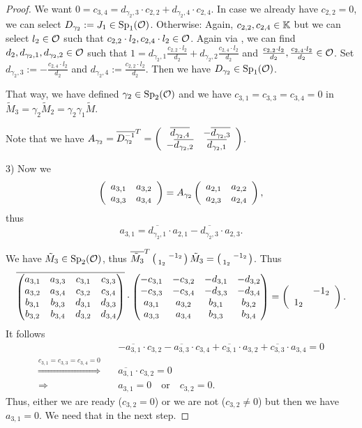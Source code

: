 \begin{lemma}[$solveR$]
\begin{proof}
We want $0 = c_{3,4} = d_{\gamma_2,3} \cdot c_{2,2} + d_{\gamma_2,4} \cdot c_{2,4}$. In case we already have $c_{2,2} = 0$, we can select $D_{\gamma_2} := J_1 \in \operatorname{Sp}_1(\mathcal{O})$. Otherwise: Again, $c_{2,2}, c_{2,4} \in \mathbb{K}$ but we can select $l_2 \in \mathcal{O}$ such that $c_{2,2} \cdot l_2, c_{2,4} \cdot l_2 \in \mathcal{O}$. Again via , we can find $d_2,d_{\gamma_2,1},d_{\gamma_2,2} \in \mathcal{O}$ such that $1 = d_{\gamma_2,1} \frac{c_{2,2} \cdot l_2}{d_2} + d_{\gamma_2,2} \frac{c_{2,4} \cdot l_2}{d_2}$ and $\frac{c_{2,2} \cdot l_2}{d_2}, \frac{c_{2,4} \cdot l_2}{d_2} \in \mathcal{O}$. Set $d_{\gamma_2,3} := -\frac{c_{2,4}\cdot l_2}{d_2}$ and $d_{\gamma_2,4} := \frac{c_{2,2} \cdot l_2}{d_2}$. Then we have $D_{\gamma_2} \in \operatorname{Sp}_1(\mathcal{O})$.

That way, we have defined $\gamma_2 \in \operatorname{Sp}_2(\mathcal{O})$ and we have $c_{3,1} = c_{3,3} = c_{3,4} = 0$ in $\tilde{M}_3 = \gamma_2 \tilde{M}_2 = \gamma_2 \gamma_1 \tilde{M}$.

Note that we have $A_{\gamma_2} = \overline{D_{\gamma_2}^{-1}}^T = \left( \begin{array}{cc} \overline{d_{\gamma_2,4}} & -\overline{d_{\gamma_2,3}} \\ -\overline{d_{\gamma_2,2}} & \overline{d_{\gamma_2,1}} \end{array} \right)$.

3) Now we
\[ \left( \begin{array}{cc} a_{3,1} & a_{3,2} \\ a_{3,3} & a_{3,4} \end{array} \right) = A_{\gamma_2} \left( \begin{array}{cc} a_{2,1} & a_{2,2} \\ a_{2,3} & a_{2,4} \end{array} \right) , \]
thus
\[ a_{3,1} = \overline{d_{\gamma_2,1}} \cdot a_{2,1} - \overline{d_{\gamma_2,3}} \cdot a_{2,3} . \]

We have $\tilde{M}_3 \in \operatorname{Sp}_2(\mathcal{O})$, thus $\overline{\tilde{M}_3}^T \left( \begin{smallmatrix}  & -1_2 \\ 1_2 &  \end{smallmatrix} \right) \tilde{M}_3 = \left( \begin{smallmatrix}  & -1_2 \\ 1_2 &  \end{smallmatrix} \right)$. Thus
\[ \overline{\begin{pmatrix}
a_{3,1} & a_{3,3} & c_{3,1} & c_{3,3} \\
a_{3,2} & a_{3,4} & c_{3,2} & c_{3,4} \\
b_{3,1} & b_{3,3} & d_{3,1} & d_{3,3} \\
b_{3,2} & b_{3,4} & d_{3,2} & d_{3,4}
\end{pmatrix}} \cdot \begin{pmatrix}
-c_{3,1} & -c_{3,2} & -d_{3,1} & -d_{3,2} \\
-c_{3,3} & -c_{3,4} & -d_{3,3} & -d_{3,4} \\
a_{3,1} & a_{3,2} & b_{3,1} & b_{3,2} \\
a_{3,3} & a_{3,4} & b_{3,3} & b_{3,4}
\end{pmatrix} = \left( \begin{array}{cc}  & -1_2 \\ 1_2 &  \end{array} \right) .
 \]
It follows
\[
\begin{array}{cl}
& - \overline{a_{3,1}} \cdot c_{3,2} - \overline{a_{3,3}} \cdot c_{3,4} + \overline{c_{3,1}} \cdot a_{3,2} + \overline{c_{3,3}} \cdot a_{3,4} = 0 \\
\overset{c_{3,1}=c_{3,3}=c_{3,4}=0}{\Longrightarrow}\quad & \overline{a_{3,1}} \cdot c_{3,2} = 0 \\
\Longrightarrow \quad & a_{3,1} = 0 \quad \text{or} \quad c_{3,2} = 0 .
\end{array}
\]
Thus, either we are ready ($c_{3,2} = 0$) or we are not ($c_{3,2} \ne 0$) but then we have $a_{3,1} = 0$. We need that in the next step.


\end{proof}
\end{lemma}
